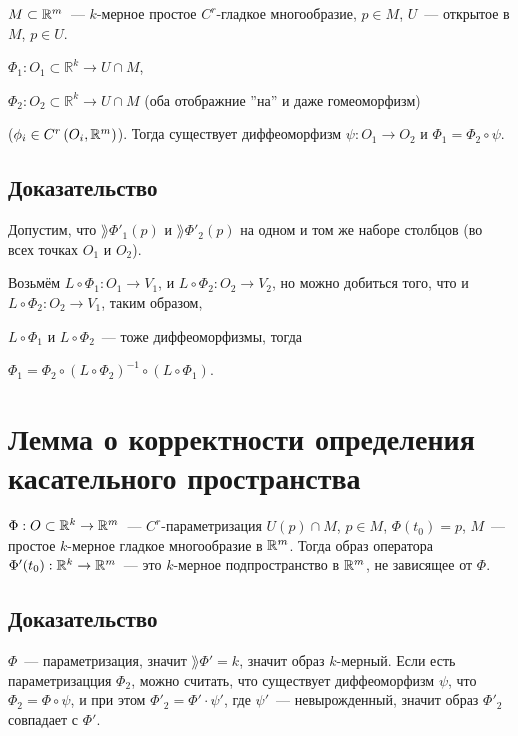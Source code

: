 \documentclass{article}
\begin{document}
        $M \subset \mathbb{R}^m$~--- $k$-мерное простое $C^r$-гладкое многообразие, $p \in M$, $U$~--- открытое в $M$, $p \in U$.
        
        $\Phi_1 : O_1 \subset \mathbb{R}^k \rightarrow U \cap M$,
        
        $\Phi_2 : O_2 \subset \mathbb{R}^k \rightarrow U \cap M$ (оба отображние ''на'' и даже гомеоморфизм)
        
        ($\phi_i \in C^r \left( O_i, \mathbb{R}^m \right)$). Тогда существует диффеоморфизм $\psi : O_1 \rightarrow O_2$ и $\Phi_1 = \Phi_2 \circ \psi$.
        
        \subsection{Доказательство}
        
            Допустим, что $\rang \Phi'_1(p)$ и $\rang \Phi'_2(p)$ на одном и том же наборе столбцов (во всех точках $O_1$ и $O_2$).
            
            Возьмём $L \circ \Phi_1 : O_1 \rightarrow V_1$, и $L \circ \Phi_2 : O_2 \rightarrow V_2$, но можно добиться того, что и $L \circ \Phi_2 : O_2 \rightarrow V_1$, таким образом,
            
            $L \circ \Phi_1$ и $L \circ \Phi_2$~--- тоже диффеоморфизмы, тогда
            
            $\Phi_1 = \Phi_2 \circ \left( L \circ \Phi_2 \right)^{-1} \circ \left( L \circ \Phi_1 \right)$.
            
    \newpage
    
    \section{Лемма о корректности определения касательного пространства}
    
        $\Phi : O \subset \mathbb{R}^k \rightarrow \mathbb{R}^m$~--- $C^r$-параметризация $U(p) \cap M$, $p \in M$, $\Phi(t_0) = p$, $M$~--- простое $k$-мерное гладкое многообразие в $\mathbb{R}^m$. Тогда образ оператора $\Phi'(t_0) : \mathbb{R}^k \rightarrow \mathbb{R}^m$~--- это $k$-мерное подпространство в $\mathbb{R}^m$, не зависящее от $\Phi$.
        
        \subsection{Доказательство}
        
            $\Phi$~--- параметризация, значит $\rang \Phi' = k$, значит образ $k$-мерный. Если есть параметризацция $\Phi_2$, можно считать, что существует диффеоморфизм $\psi$, что $\Phi_2 = \Phi \circ \psi$, и при этом $\Phi'_2 = \Phi' \cdot \psi'$, где $\psi'$~--- невырожденный, значит образ $\Phi'_2$ совпадает с $\Phi'$.
            
\end{document}
